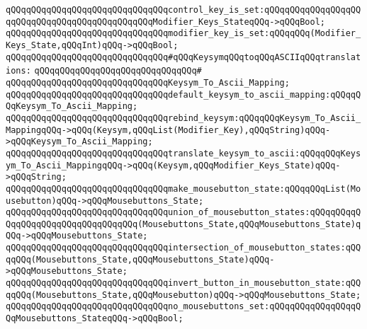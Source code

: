 \verb|qQQqqQQqqQQqqQQqqQQqqQQqqQQqqQQqcontrol_key_is_set:qQQqqQQqqQQqqQQqqQQqqQQqqQQqqQQqqQQqqQQqqQQqqQQqModifier_Keys_StateqQQq->qQQqBool;|\newline
\newline
\verb|qQQqqQQqqQQqqQQqqQQqqQQqqQQqqQQqmodifier_key_is_set:qQQqqQQq(Modifier_Keys_State,qQQqInt)qQQq->qQQqBool;|\newline
\newline
\verb|qQQqqQQqqQQqqQQqqQQqqQQqqQQqqQQq#qQQqKeysymqQQqtoqQQqASCIIqQQqtranslations:|\newline
\verb|qQQqqQQqqQQqqQQqqQQqqQQqqQQqqQQq#|\newline
\verb|qQQqqQQqqQQqqQQqqQQqqQQqqQQqqQQqKeysym_To_Ascii_Mapping;|\newline
\newline
\verb|qQQqqQQqqQQqqQQqqQQqqQQqqQQqqQQqdefault_keysym_to_ascii_mapping:qQQqqQQqKeysym_To_Ascii_Mapping;|\newline
\newline
\verb|qQQqqQQqqQQqqQQqqQQqqQQqqQQqqQQqrebind_keysym:qQQqqQQqKeysym_To_Ascii_MappingqQQq->qQQq(Keysym,qQQqList(Modifier_Key),qQQqString)qQQq->qQQqKeysym_To_Ascii_Mapping;|\newline
\newline
\verb|qQQqqQQqqQQqqQQqqQQqqQQqqQQqqQQqtranslate_keysym_to_ascii:qQQqqQQqKeysym_To_Ascii_MappingqQQq->qQQq(Keysym,qQQqModifier_Keys_State)qQQq->qQQqString;|\newline
\newline
\newline
\newline
\verb|qQQqqQQqqQQqqQQqqQQqqQQqqQQqqQQqmake_mousebutton_state:qQQqqQQqList(Mousebutton)qQQq->qQQqMousebuttons_State;|\newline
\newline
\verb|qQQqqQQqqQQqqQQqqQQqqQQqqQQqqQQqunion_of_mousebutton_states:qQQqqQQqqQQqqQQqqQQqqQQqqQQqqQQqqQQq(Mousebuttons_State,qQQqMousebuttons_State)qQQq->qQQqMousebuttons_State;|\newline
\verb|qQQqqQQqqQQqqQQqqQQqqQQqqQQqqQQqintersection_of_mousebutton_states:qQQqqQQq(Mousebuttons_State,qQQqMousebuttons_State)qQQq->qQQqMousebuttons_State;|\newline
\newline
\verb|qQQqqQQqqQQqqQQqqQQqqQQqqQQqqQQqinvert_button_in_mousebutton_state:qQQqqQQq(Mousebuttons_State,qQQqMousebutton)qQQq->qQQqMousebuttons_State;|\newline
\newline
\verb|qQQqqQQqqQQqqQQqqQQqqQQqqQQqqQQqno_mousebuttons_set:qQQqqQQqqQQqqQQqqQQqMousebuttons_StateqQQq->qQQqBool;|\newline
